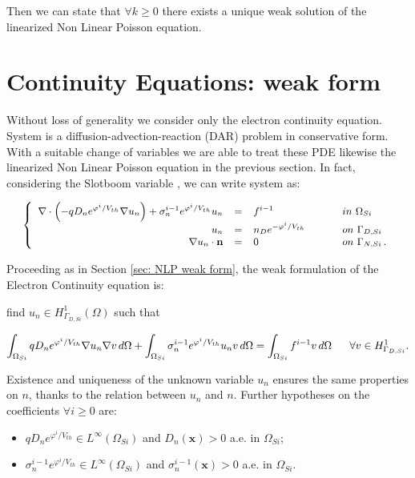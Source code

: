 Then we can state that $\forall k \geq 0$ there exists a unique weak solution of the linearized Non Linear Poisson equation.

\section{Continuity Equations: weak form}
\label{sec: LEC weak}

Without loss of generality we consider only the electron continuity equation. System  is a diffusion-advection-reaction (DAR) problem in conservative form. With a suitable change of variables we are able to treat these PDE likewise the linearized Non Linear Poisson equation in the previous section. In fact, considering the Slotboom variable , we can write system  as:

\begin{equation}
\label{eq: system continuity equation}
\small
\left\{
\begin{array}{rcll}
 \nabla \cdot \left( - q D_n e^{\varphi^{i}/V_{th}}\nabla u_n \right) + \sigma_n^{i-1} e^{\varphi^{i}/V_{th}} u_n& = & f^{i-1}  & \psp{15} in \psp{2} \Omega_{Si} \\
u_n & = &  n_D e^{-\varphi^{i}/V_{th}} & \psp{15} on \psp{2} \Gamma_{D,Si} \\
\nabla u_n \cdot \vect{n} & = & 0 & \psp{15} on \psp{2} \Gamma_{N,Si} \, .
\end{array}
\right.
\end{equation}

Proceeding as in Section \ref{sec: NLP weak form}, the weak formulation of the Electron Continuity equation is: 

find $u_n \in H^1_{\Gamma_{D,Si}}(\Omega)$ such that

\begin{equation}
\footnotesize
\label{eq: LEC weakformulation}
\int_{\Omega_{Si}}  q D_n e^{\varphi^{i}/V_{th}} \nabla u_n \nabla v \, d\Omega + \int_{\Omega_{Si}} \sigma_n^{i-1} e^{\varphi^{i}/V_{th}} u_n v \, d\Omega = \int_{\Omega_{Si}} f^{i-1}v \, d\Omega \psp{10} \forall v \in H^1_{\Gamma_{D,Si}}.
\end{equation}


Existence and uniqueness of the unknown variable $u_n$ ensures the same properties on $n$, thanks to the relation  between $u_n$ and $n$.
Further hypotheses on the coefficients $\forall i\geq 0$ are:
\begin{itemize}
\item $q D_n e^{\varphi^{i}/V_{th}} \in L^{\infty}(\Omega_{Si})$ and $D_n(\mathbf{x})>0$ a.e. in $\Omega_{Si}$;
\item  $\sigma_n^{i-1} e^{\varphi^i/V_{th}} \in L^{\infty}(\Omega_{Si})$ and $\sigma_n^{i-1}(\mathbf{x})>0$ a.e. in $\Omega_{Si}$.
\end{itemize}

